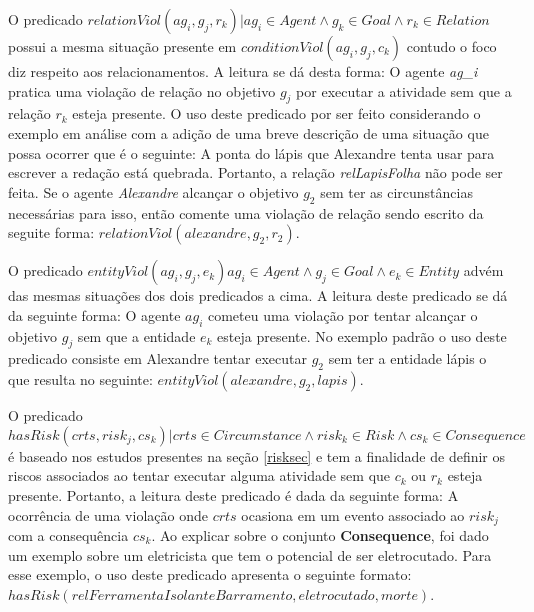 O predicado $ relationViol(ag_i,g_j,r_k) | ag_i \in Agent \wedge g_k \in Goal \wedge r_k \in Relation $ possui a mesma situação presente em $ conditionViol(ag_i,g_j,c_k) $ contudo o foco diz respeito aos relacionamentos. A leitura se dá desta forma: O agente \textit{ag\_i} pratica uma violação de relação no objetivo $g_j$ por executar a atividade sem que a relação $r_k$ esteja presente. O uso deste predicado por ser feito considerando o exemplo em análise com a adição de uma breve descrição de uma situação que possa ocorrer que é o seguinte: A ponta do lápis que Alexandre tenta usar para escrever a redação está quebrada. Portanto, a relação \textit{relLapisFolha} não pode ser feita. Se o agente \textit{Alexandre} alcançar o objetivo $g_2$ sem ter as circunstâncias necessárias para isso, então comente uma violação de relação sendo escrito da seguite forma: $relationViol(alexandre,g_2,r_2)$.

O predicado $ entityViol(ag_i,g_j,e_k) ag_i \in Agent \wedge g_j \in Goal \wedge e_k \in Entity$ advém das mesmas situações dos dois predicados a cima. A leitura deste predicado se dá da seguinte forma: O agente $ag_i$ cometeu uma violação por tentar alcançar o objetivo $g_j$ sem que a entidade $e_k$ esteja presente. No exemplo padrão o uso deste predicado consiste em Alexandre tentar executar $g_2$ sem ter a entidade lápis o que resulta no seguinte: $entityViol(alexandre, g_2, lapis)$.

O predicado $ hasRisk(crts, risk_j, cs_k) | crts \in Circumstance \wedge  risk_k \in Risk \wedge cs_k \in Consequence $ é baseado nos estudos presentes na seção \ref{risksec} e tem a finalidade de definir os riscos associados ao tentar executar alguma atividade sem que $c_k$ ou $r_k$ esteja presente. Portanto, a leitura deste predicado é dada da seguinte forma: A ocorrência de uma violação onde $crts$ ocasiona em um evento associado ao $risk_j$ com a consequência $cs_k$. Ao explicar sobre o conjunto \textbf{Consequence}, foi dado um exemplo sobre um eletricista que tem o potencial de ser eletrocutado. Para esse exemplo, o uso deste predicado apresenta o seguinte formato: $hasRisk(relFerramentaIsolanteBarramento, eletrocutado, morte)$.

